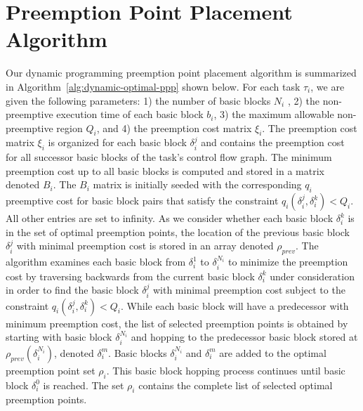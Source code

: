 \vspace{-10pt}
\section{Preemption Point Placement Algorithm}\label{sec:implementation}

Our dynamic programming preemption point placement algorithm is summarized in Algorithm~\ref{alg:dynamic-optimal-ppp} shown below.  For each task $\tau_i$, we are given the following parameters: 1) the number of basic blocks $N_i$ , 2) the non-preemptive execution time of each basic block $b_i$, 3) the maximum allowable non-preemptive region $Q_i$, and 4) the preemption cost matrix $\xi_i$.  The preemption cost matrix $\xi_i$ is organized for each basic block \begin{math}\delta_{i}^{j}\end{math} and contains the preemption cost for all successor basic blocks of the task's control flow graph.  The minimum preemption cost up to all basic blocks is computed and stored in a matrix denoted $B_{i}$.  The $B_{i}$ matrix is initially seeded with the corresponding $q_i$ preemptive cost for basic block pairs that satisfy the constraint $q_{i}(\delta_{i}^{j},\delta_{i}^{k}) < Q_{i}$. All other entries are set to infinity.  As we consider whether each basic block $\delta_{i}^{k}$ is in the set of optimal preemption points, the location of the previous basic block $\delta_{i}^{j}$ with minimal preemption cost is stored in an array denoted $\rho_{prev}$.  The algorithm examines each basic block from \begin{math}\delta_{i}^{1}\end{math} to \begin{math}\delta_{i}^{N_i}\end{math} to minimize the preemption cost by traversing backwards from the current basic block $\delta_{i}^{k}$ under consideration in order to find the basic block $\delta_{i}^{j}$ with minimal preemption cost subject to the constraint $q_{i}(\delta_{i}^{j},\delta_{i}^{k}) < Q_{i}$.  While each basic block will have a predecessor with minimum preemption cost, the list of selected preemption points is obtained by starting with basic block $\delta_{i}^{N_i}$ and hopping to the predecessor basic block stored at $\rho_{prev}(\delta_{i}^{N_i})$, denoted $\delta_{i}^{m}$.  Basic blocks $\delta_{i}^{N_i}$ and $\delta_{i}^{m}$ are added to the optimal preemption point set $\rho_{i}$.  This basic block hopping process continues until basic block $\delta_{i}^{0}$ is reached.  The set $\rho_{i}$ contains the complete list of selected optimal preemption points.
